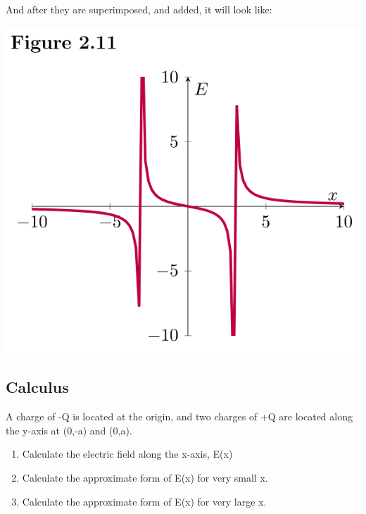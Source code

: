 \begin{solution}
And after they are superimposed, and added, it will look like:

\begin{center}


\includegraphics{Figures/Figure211}
\end{center}

\end{solution}



\subsection*{Calculus}

\begin{question}
A charge of -Q is located at the origin, and two charges of +Q are located along the y-axis at (0,-a) and (0,a).

\begin{enumerate}[label=(\alph*)]
    \item Calculate the electric field along the x-axis, E(x)
    \item Calculate the approximate form of E(x) for very small x.
    \item Calculate the approximate form of E(x) for very large x.
\end{enumerate}
\end{question}

